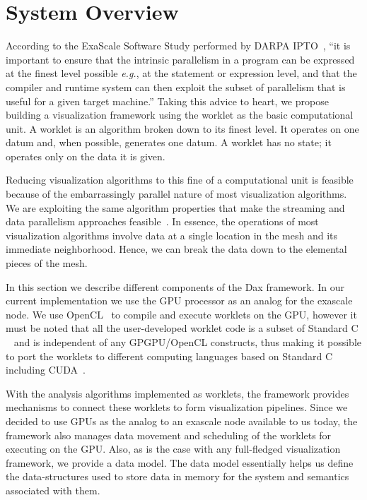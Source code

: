 \documentclass{vgtc}                          %
\newcommand*{\lcite}[1]{~\cite{#1}}
\begin{document}
\section{System Overview}
\label{sec:SystemOverview}

According to the ExaScale Software Study performed by DARPA
IPTO\lcite{DARPAExascaleStudy}, ``it is important to ensure that the
intrinsic parallelism in a program can be expressed at the finest level
possible \emph{e.g.}, at the statement or expression level, and that the
compiler and runtime system can then exploit the subset of parallelism that
is useful for a given target machine.''  Taking this advice to heart, we
propose building a visualization framework using the worklet as the basic
computational unit.  A worklet is an algorithm broken down to its finest
level.  It operates on one datum and, when possible, generates one datum.
A worklet has no state; it operates only on the data it is given.

Reducing visualization algorithms to this fine of a computational unit is
feasible because of the embarrassingly parallel nature of most
visualization algorithms.  We are exploiting the same algorithm properties
that make the streaming and data parallelism approaches
feasible\lcite{Ahrens00,Ahrens01}.  In essence, the operations of most
visualization algorithms involve data at a single location in the mesh and
its immediate neighborhood.  Hence, we can break the data down to the
elemental pieces of the mesh. 

In this section we describe different components of the Dax framework. In our
current implementation we use the GPU processor as an analog for the exascale
node. We use OpenCL\lcite{OpenCL} to compile and execute worklets on the GPU, however it must
be noted that all the user-developed worklet code is a subset of Standard C
\lcite{ANSIC} and
is independent of any GPGPU/OpenCL constructs, thus making it possible to port
the worklets to different computing languages based on Standard C including CUDA\lcite{CUDA}.

With the analysis algorithms implemented as worklets, the framework provides 
mechanisms to connect these worklets to form visualization pipelines. Since we
decided to use GPUs as the analog to an exascale node available to us today, the
framework also manages data movement and scheduling of the worklets for
executing on the GPU. Also, as is the case with any full-fledged visualization
framework, we provide a data model. The data model essentially helps us
define the data-structures used to store data in memory for the system and
semantics associated with them.
\end{document}
